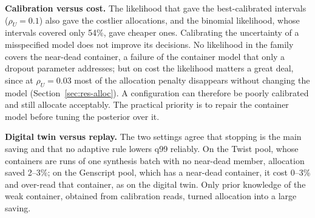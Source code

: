 \documentclass[acmsmall,screen]{acmart}
\begin{document}
\textbf{Calibration versus cost.}  The likelihood that gave the best-calibrated intervals
($\rho_U{=}0.1$) also gave the costlier allocations, and the binomial likelihood, whose intervals covered
only 54\%, gave cheaper ones.  Calibrating the uncertainty of a misspecified model does not improve its
decisions.  No likelihood in the family covers the near-dead container, a failure of the container model
that only a dropout parameter addresses; but on cost the likelihood matters a great deal, since at
$\rho_U{=}0.03$ most of the allocation penalty disappears without changing the model
(Section~\ref{sec:res-alloc}).  A configuration can therefore be poorly calibrated and still allocate
acceptably.  The practical priority is to repair the container model before tuning the posterior over it.

\textbf{Digital twin versus replay.}  The two settings agree that stopping is the main saving and that
no adaptive rule lowers q99 reliably.  On the Twist pool, whose containers are runs of one synthesis
batch with no near-dead member, allocation saved 2--3\%; on the Genscript pool, which has a near-dead
container, it cost 0--3\% and over-read that container, as on the digital twin.  Only prior knowledge of
the weak container, obtained from calibration reads, turned allocation into a large saving.
\end{document}
